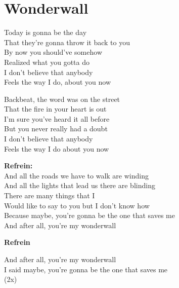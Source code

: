 \section{Wonderwall}
Today is gonna be the day\\
That they're gonna throw it back to you\\
By now you should've somehow\\
Realized what you gotta do\\
I don't believe that anybody\\
Feels the way I do, about you now

Backbeat, the word was on the street\\
That the fire in your heart is out\\
I'm sure you've heard it all before\\
But you never really had a doubt\\
I don't believe that anybody\\
Feels the way I do about you now

\textbf{Refrein:}\\
And all the roads we have to walk are winding\\
And all the lights that lead us there are blinding\\
There are many things that I\\
Would like to say to you but I don't know how\\
Because maybe, you're gonna be the one that saves me\\
And after all, you're my wonderwall

\textbf{Refrein}

And after all, you're my wonderwall\\
I said maybe, you're gonna be the one that saves me\\
(2x)